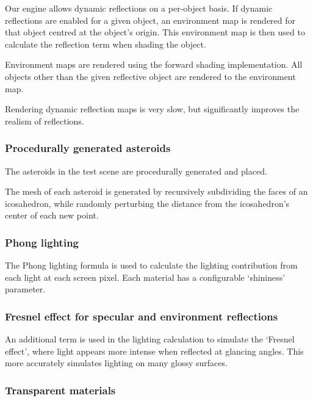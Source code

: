 \documentclass[11pt]{scrartcl} %
\begin{document}
            Our engine allows dynamic reflections on a per-object basis. If
            dynamic reflections are enabled for a given object, an environment
            map is rendered for that object centred at the object's origin.
            This environment map is then used to calculate the reflection term
            when shading the object.

            Environment maps are rendered using the forward shading
            implementation. All objects other than the given reflective object
            are rendered to the environment map.

            Rendering dynamic reflection maps is very slow, but significantly
            improves the realism of reflections.

        \subsubsection{Procedurally generated asteroids}

            The asteroids in the test scene are procedurally generated and
            placed.

            The mesh of each asteroid is generated by recursively subdividing
            the faces of an icosahedron, while randomly perturbing the distance
            from the icosahedron's center of each new point.

        \subsubsection{Phong lighting}

            The Phong lighting formula is used to calculate the lighting
            contribution from each light at each screen pixel. Each material
            has a configurable `shininess' parameter.

        \subsubsection{Fresnel effect for specular and environment reflections}

            An additional term is used in the lighting calculation to simulate
            the `Fresnel effect', where light appears more intense when
            reflected at glancing angles. This more accurately simulates
            lighting on many glossy surfaces.

        \subsubsection{Transparent materials}
\end{document}
